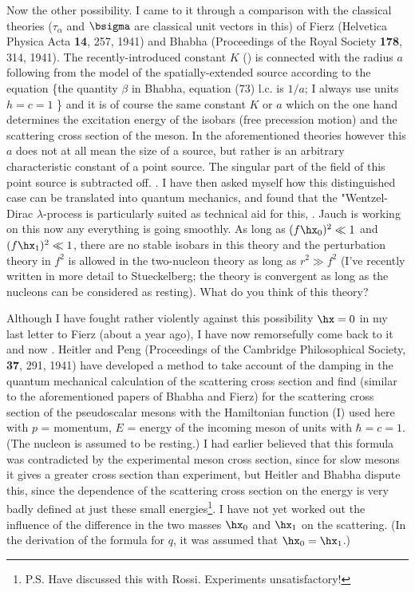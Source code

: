 Now the other possibility. I came to it through a comparison with the classical theories ($\tau_\alpha$ and $\bsigma$ are classical unit vectors in this) of Fierz (Helvetica Physica Acta \textbf{14}, 257, 1941) and Bhabha (Proceedings of the Royal Society \textbf{178}, 314, 1941). The recently-introduced constant $K$ () is connected with the radius $a$ following from the model of the spatially-extended source according to the equation
\{the quantity $\beta$ in Bhabha, equation (73) l.c. is $1/a$; I always use units $h = c = 1$ \} and it is of course the same constant $K$ or $a$ which on the one hand determines the excitation energy of the isobars (free precession motion) and the scattering cross section of the meson. In the aforementioned theories however this $a$ does not at all mean the size of a source, but rather is an arbitrary characteristic constant of a point source. The singular part of the field of this point source is subtracted off. . I have then asked myself how this distinguished case can be translated into quantum mechanics, and found that the "Wentzel-Dirac $\lambda$-process is particularly suited as technical aid for this, . Jauch is working on this now any everything is going smoothly. As long as $(f\hx_0)^2 \ll 1$ and $(f\hx_1)^2 \ll 1$, there are no stable isobars in this theory and the perturbation theory in $f^2$ is allowed in the two-nucleon theory as long as $r^2 \gg f^2$ (I've recently written in more detail to Stueckelberg; the theory is convergent as long as the nucleons can be considered as resting). What do you think of this theory?

Although I have fought rather violently against this possibility $\hx=0$ in my last letter to Fierz (about a year ago), I have now remorsefully come back to it and now . Heitler and Peng (Proceedings of the Cambridge Philosophical Society, \textbf{37}, 291, 1941) have developed a method to take account of the damping in the quantum mechanical calculation of the scattering cross section and find (similar to the aforementioned papers of Bhabha and Fierz) for the scattering cross section of the pseudoscalar mesons with the Hamiltonian function (I) used here
with $p$ = momentum, $E$ = energy of the incoming meson of units with $\hbar = c = 1$. (The nucleon is assumed to be resting.) I had earlier believed that this formula was contradicted by the experimental meson cross section, since for slow mesons it gives a greater cross section than experiment, but Heitler and Bhabha dispute this, since the dependence of the scattering cross section on the energy is very badly defined at just these small energies\footnote{P.S. Have discussed this with Rossi. Experiments unsatisfactory!}. I have not yet worked out the influence of the difference in the two masses $\hx_0$ and $\hx_1$ on the scattering. (In the derivation of the formula for $q$, it was assumed that $\hx_0 = \hx_1$.)

